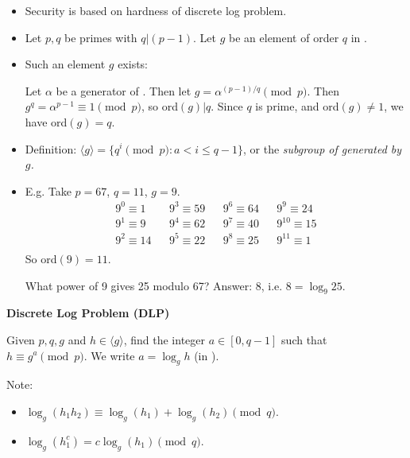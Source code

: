 \documentclass[a4paper,12pt]{article}
\begin{document}
\begin{itemize}
 \item 
 Security is based on hardness of discrete log problem.
 \item
 Let $p,q$ be primes with $q|(p-1)$.  Let $g$ be an element of order $q$ in \zps.
 \item
 Such an element $g$ exists:
 
 Let $\alpha$ be a generator of \zps.  Then let $g=\alpha^{(p-1)/q}\pmod p$.
 Then $g^q = \alpha^{p-1} \equiv 1 \pmod p$, so ord$(g)|q$.  
 Since $q$ is prime, and ord$(g)\ne 1$, we have ord$(g)=q$.
 \item
 Definition: $\langle g \rangle = \{q^i \pmod p : a < i \le q-1 \}$, or the
 {\it subgroup of \zps generated by $g$.}
 \item
 E.g. Take $p=67$, $q=11$, $g=9$.
 \begin{align*}
 9^0 \equiv 1 & & 9^3 \equiv 59 && 9^6 \equiv 64 & & 9^9 \equiv 24 \\
 9^1 \equiv 9 & & 9^4 \equiv 62 && 9^7 \equiv 40 & & 9^{10} \equiv 15\\
 9^2 \equiv 14 && 9^5 \equiv 22 && 9^8 \equiv 25 & & 9^{11} \equiv 1\\
 \end{align*}
So ord$(9)=11$.

What power of 9 gives 25 modulo 67?  Answer: 8, i.e. $8=\log_9 25$.
\end{itemize}
{\bf Discrete Log Problem (DLP)}

Given $p,q,g$ and $h\in \langle g \rangle$, find the integer $a\in [0,q-1]$ such that
$h\equiv g^a \pmod p$.  We write $a=\log_g h$ (in \zps).

Note:
\begin{itemize}
 \item $\log_g(h_1h_2)\equiv \log_g(h_1) + \log_g(h_2)\pmod q$.
 \item $\log_g(h_1^c)=c\log_g(h_1) \pmod q$.
\end{itemize}
\end{document}
